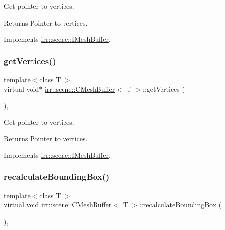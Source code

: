 Get pointer to vertices. 

\begin{DoxyReturn}{Returns}
Pointer to vertices. 
\end{DoxyReturn}


Implements \hyperlink{classirr_1_1scene_1_1IMeshBuffer_ac1695efc198b05a086487606bc2783e7}{irr\+::scene\+::\+I\+Mesh\+Buffer}.

\mbox{\label{classirr_1_1scene_1_1CMeshBuffer_a9173c9d0c6f32890ab75dc501aaf5be6}} 
\subsubsection{\texorpdfstring{get\+Vertices()}{getVertices()}\hspace{0.1cm}{\footnotesize\ttfamily [4/4]}}
{\footnotesize\ttfamily template$<$class T $>$ \\
virtual void$\ast$ \hyperlink{classirr_1_1scene_1_1CMeshBuffer}{irr\+::scene\+::\+C\+Mesh\+Buffer}$<$ T $>$\+::get\+Vertices (\begin{DoxyParamCaption}{ }\end{DoxyParamCaption})\hspace{0.3cm}{\ttfamily [inline]}, {\ttfamily [virtual]}}



Get pointer to vertices. 

\begin{DoxyReturn}{Returns}
Pointer to vertices. 
\end{DoxyReturn}


Implements \hyperlink{classirr_1_1scene_1_1IMeshBuffer_ac1695efc198b05a086487606bc2783e7}{irr\+::scene\+::\+I\+Mesh\+Buffer}.

\mbox{\label{classirr_1_1scene_1_1CMeshBuffer_aad55263eaf019b090c8d1c3c5f7f4407}} 
\subsubsection{\texorpdfstring{recalculate\+Bounding\+Box()}{recalculateBoundingBox()}\hspace{0.1cm}{\footnotesize\ttfamily [1/2]}}
{\footnotesize\ttfamily template$<$class T $>$ \\
virtual void \hyperlink{classirr_1_1scene_1_1CMeshBuffer}{irr\+::scene\+::\+C\+Mesh\+Buffer}$<$ T $>$\+::recalculate\+Bounding\+Box (\begin{DoxyParamCaption}{ }\end{DoxyParamCaption})\hspace{0.3cm}{\ttfamily [inline]}, {\ttfamily [virtual]}}



